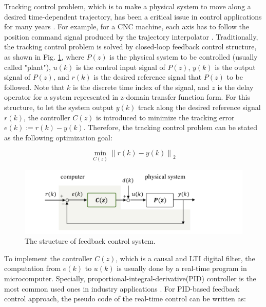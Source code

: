 \documentclass[a4paper, 12pt, twoside, openright]{mythesis}
\begin{document}
Tracking control problem, which is to make a physical system to move along a desired time-dependent trajectory, has been a critical issue in control applications for many years \cite{tomizuka1987zero}. For example, for a CNC machine, each axis has to follow the position command signal produced by the trajectory interpolator  \cite{ramesh2005tracking}. Traditionally, the tracking control problem is solved by closed-loop feedback control structure, as shown in Fig. \ref{fig:FB_Ctrl}, where $P(z)$ is the physical system to be controlled (usually called "plant"), $u(k)$ is the control input signal of $P(z)$, $y(k)$ is the output signal of $P(z)$, and $r(k)$ is the desired reference signal that $P(z)$ to be followed. Note that $k$ is the discrete time index of the signal, and $z$ is the delay operator for a system represented in z-domain transfer function form. For this structure, to let the system output $y(k)$ track along the desired reference signal $r(k)$, the controller $C(z)$ is introduced to minimize the tracking error $e(k):= r(k)-y(k)$. Therefore, the tracking control problem can be stated as the following optimization goal:


\begin{equation}
\min_{C(z)} \left \| r(k)-y(k) \right \|_2
\label{eq:TrackingCtrl_Prob}
\end{equation}



\begin{figure}
 	\begin{center}
   	\includegraphics[width=1.1\linewidth] {image/FB_Ctrl}
 	\caption{The structure of feedback control system.}
 	\label{fig:FB_Ctrl}
 	\end{center}
\end{figure}

To implement the controller $C(z)$, which is a causal and LTI digital filter, the computation from $e(k)$ to $u(k)$ is usually done by a real-time program in microcomputer. Specially, proportional-integral-derivative(PID) controller is the most common used ones in industry applications  \cite{ramesh2005tracking}. For PID-based feedback control approach, the pseudo code of the real-time control can be written as:
\end{document}
